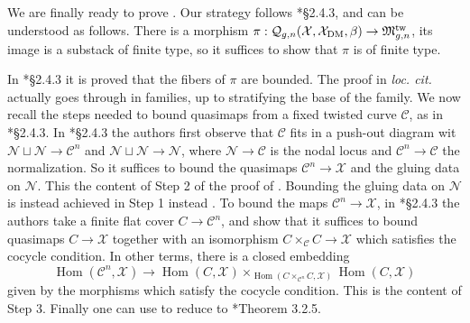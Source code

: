 \documentclass{amsart}
\newcommand{\cC}{\mathcal{C}}
\newcommand{\cN}{\mathcal{N}}
\newcommand{\cQ}{\mathcal{Q}}
\newcommand{\cX}{\mathcal{X}}
\newcommand{\Hom}{\operatorname{Hom}}
\newcommand{\dm}{{\rm DM}}
\theoremstyle{definition}
\theoremstyle{definition}
\begin{document}
{    We are finally ready to prove . Our strategy follows \cite{orbifold_qmap_theory}*{\S 2.4.3}, and can be understood as follows.
There is a morphism $\pi:\cQ_{g,n}(\cX,\cX_\dm,\beta)\to \mathfrak{M}_{g,n}^{\operatorname{tw}}$, its image is a substack of finite type, so it suffices to show that $\pi$ is of finite type. 

    In \cite{orbifold_qmap_theory}*{\S 2.4.3} it is proved that the fibers of $\pi$ are bounded. The proof in \emph{loc. cit.} actually goes through in families, up to stratifying the base of the family.
        We now recall the steps needed to bound quasimaps from a fixed twisted curve $\cC$, as in \cite{orbifold_qmap_theory}*{\S 2.4.3}. In \cite{orbifold_qmap_theory}*{\S 2.4.3} the authors first observe that $\cC$ fits in a push-out diagram wit $\cN\sqcup \cN\to \cC^n$ and $\cN\sqcup \cN\to \cN$, where $\cN\to \cC$ is the nodal locus and $\cC^n\to \cC$ the normalization.
        So it suffices to bound the quasimaps $\cC^n\to \cX$ and the gluing data on $\cN$. This the content of Step 2 of the proof of . Bounding the gluing data on $\cN$ is instead achieved in Step 1 instead . To bound the maps $\cC^n\to \cX$, in \cite{orbifold_qmap_theory}*{\S 2.4.3} the authors take a finite flat cover $C\to \cC^n$, and show that it suffices to bound quasimaps $C\to \cX$ together with an isomorphism $C\times_\cC C\to \cX$ which satisfies the cocycle condition. In other terms, there is a closed embedding \[\Hom(\cC^n,\cX)\to \Hom(C,\cX)\times_{\Hom(C\times_{\cC^n}C,\cX)}\Hom(C,\cX)\]
    given by the morphisms which satisfy the cocycle condition. This is the content of Step 3. Finally one can use  to reduce to \cite{ciocan2014stable}*{Theorem 3.2.5}.

}
\end{document}
